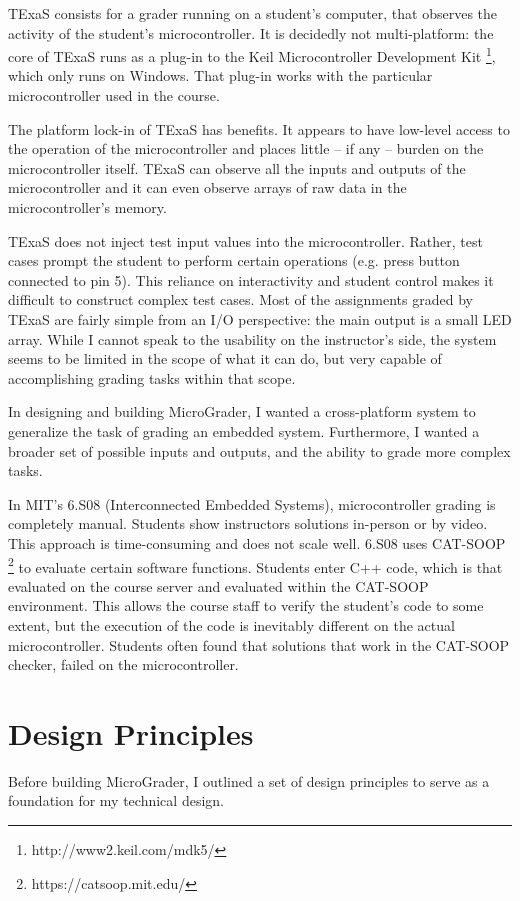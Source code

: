 \documentclass[12pt]{article}
\begin{document}
TExaS consists for a grader running on a student's computer, that observes the activity of the student's microcontroller.  It is decidedly not multi-platform: the core of TExaS runs as a plug-in to the Keil Microcontroller Development Kit \footnote{http://www2.keil.com/mdk5/}, which only runs on Windows.  That plug-in works with the particular microcontroller used in the course.

The platform lock-in of TExaS has benefits.  It appears to have low-level access to the operation of the microcontroller and places little -- if any -- burden on the microcontroller itself.  TExaS can observe all the inputs and outputs of the microcontroller and it can even observe arrays of raw data in the microcontroller's memory.

TExaS does not inject test input values into the microcontroller.  Rather, test cases prompt the student to perform certain operations (e.g. press button connected to pin 5).  This reliance on interactivity and student control makes it difficult to construct complex test cases.  Most of the assignments graded by TExaS are fairly simple from an I/O perspective: the main output is a small LED array.  While I cannot speak to the usability on the instructor's side, the system seems to be limited in the scope of what it can do, but very capable of accomplishing grading tasks within that scope.

In designing and building MicroGrader, I wanted a cross-platform system to generalize the task of grading an embedded system.  Furthermore, I wanted a broader set of possible inputs and outputs, and the ability to grade more complex tasks.

In MIT's 6.S08 (Interconnected Embedded Systems), microcontroller grading is completely manual.  Students show instructors solutions in-person or by video.  This approach is time-consuming and does not scale well.  6.S08 uses CAT-SOOP \footnote{https://catsoop.mit.edu/} to evaluate certain software functions.  Students enter C++ code, which is that evaluated on the course server and evaluated within the CAT-SOOP environment.  This allows the course staff to verify the student's code to some extent, but the execution of the code is inevitably different on the actual microcontroller.  Students often found that solutions that work in the CAT-SOOP checker, failed on the microcontroller.

\newpage
\section{Design Principles}
Before building MicroGrader, I outlined a set of design principles to serve as a foundation for my technical design.
\end{document}
